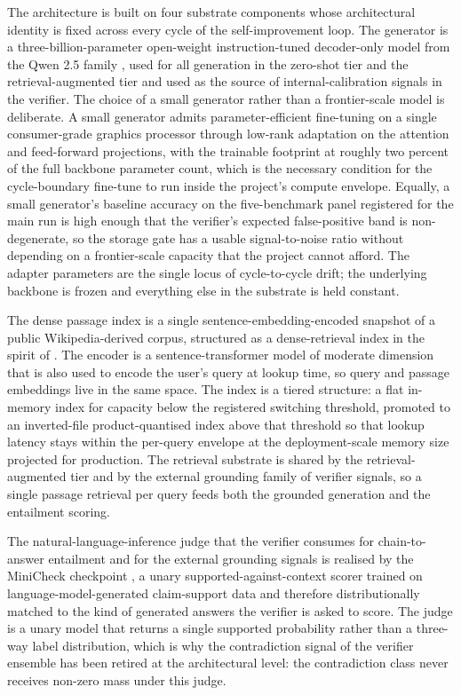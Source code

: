 The architecture is built on four substrate components whose architectural identity is fixed across every cycle of the self-improvement loop. The generator is a three-billion-parameter open-weight instruction-tuned decoder-only model from the Qwen 2.5 family \cite{qwen25}, used for all generation in the zero-shot tier and the retrieval-augmented tier and used as the source of internal-calibration signals in the verifier. The choice of a small generator rather than a frontier-scale model is deliberate. A small generator admits parameter-efficient fine-tuning on a single consumer-grade graphics processor through low-rank adaptation on the attention and feed-forward projections, with the trainable footprint at roughly two percent of the full backbone parameter count, which is the necessary condition for the cycle-boundary fine-tune to run inside the project's compute envelope. Equally, a small generator's baseline accuracy on the five-benchmark panel registered for the main run is high enough that the verifier's expected false-positive band is non-degenerate, so the storage gate has a usable signal-to-noise ratio without depending on a frontier-scale capacity that the project cannot afford. The adapter parameters are the single locus of cycle-to-cycle drift; the underlying backbone is frozen and everything else in the substrate is held constant.

The dense passage index is a single sentence-embedding-encoded snapshot of a public Wikipedia-derived corpus, structured as a dense-retrieval index in the spirit of \cite{karpukhin-etal-2020-dense}. The encoder is a sentence-transformer model of moderate dimension \cite{reimers-gurevych-2019-sentence} that is also used to encode the user's query at lookup time, so query and passage embeddings live in the same space. The index is a tiered structure: a flat in-memory index for capacity below the registered switching threshold, promoted to an inverted-file product-quantised index above that threshold so that lookup latency stays within the per-query envelope at the deployment-scale memory size projected for production. The retrieval substrate is shared by the retrieval-augmented tier and by the external grounding family of verifier signals, so a single passage retrieval per query feeds both the grounded generation and the entailment scoring.

The natural-language-inference judge that the verifier consumes for chain-to-answer entailment and for the external grounding signals is realised by the MiniCheck checkpoint \cite{tang2024minicheck}, a unary supported-against-context scorer trained on language-model-generated claim-support data and therefore distributionally matched to the kind of generated answers the verifier is asked to score. The judge is a unary model that returns a single supported probability rather than a three-way label distribution, which is why the contradiction signal of the verifier ensemble has been retired at the architectural level: the contradiction class never receives non-zero mass under this judge.

